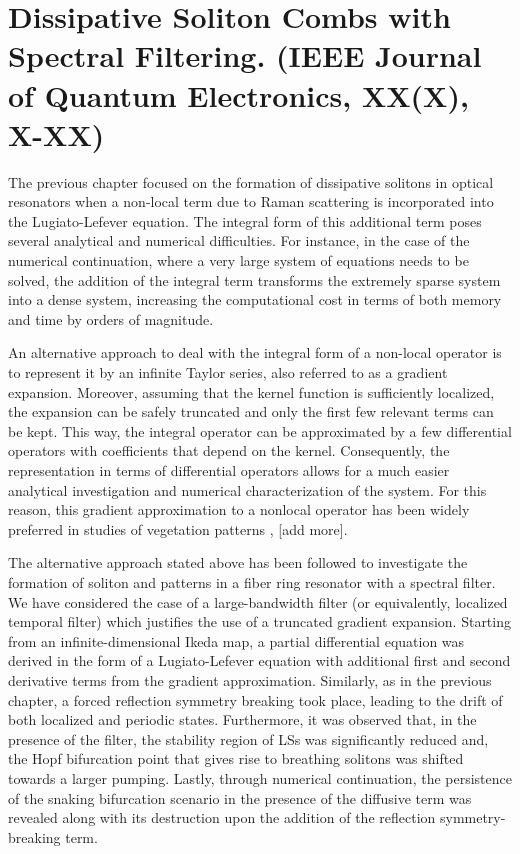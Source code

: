 \chapter{Dissipative Soliton Combs with Spectral Filtering. (IEEE Journal of Quantum Electronics, XX(X), X-XX)}

The previous chapter focused on the formation of dissipative solitons in optical
resonators when a non-local term due to Raman scattering is incorporated into the Lugiato-Lefever equation. The
integral form of this additional term poses several analytical and numerical difficulties.
For instance, in the case of the numerical continuation, where a very
large system of equations needs to be solved, the addition of the integral term transforms the extremely sparse
system into a dense system, increasing the computational cost in terms of both memory and time
by orders of magnitude.

An alternative approach to deal with the integral form of a non-local operator is to represent
it by an infinite Taylor series, also referred to as a gradient expansion. Moreover, 
assuming that the kernel function is sufficiently localized, the expansion can be
safely truncated and only the first few relevant terms can be kept. This way, the integral operator can be
approximated by a few differential operators with coefficients that depend on
the kernel. Consequently, the representation in terms of differential operators
allows for a much easier analytical investigation and numerical characterization of the system.
For this reason, this gradient approximation to a nonlocal operator has been widely 
preferred in studies of vegetation patterns \cite{lefever1997origin}, [add more].

The alternative approach stated above has been followed to investigate
the formation of soliton and patterns in a fiber ring resonator with a spectral filter. 
We have considered the case of a large-bandwidth filter (or equivalently, localized temporal filter)
which justifies the use of a truncated gradient expansion. Starting from an infinite-dimensional
Ikeda map, a partial differential equation was derived in the form of a Lugiato-Lefever equation with additional
first and second derivative terms from the gradient approximation. Similarly, as in the previous chapter,
a forced reflection symmetry breaking took place, leading to the drift of both localized and periodic states.
Furthermore, it was observed that, in the presence of the filter, the stability region of LSs was significantly reduced
and, the Hopf bifurcation point that gives rise to breathing solitons was shifted towards a larger pumping.
Lastly, through numerical continuation, the persistence of the snaking bifurcation scenario in
the presence of the diffusive term was revealed along with its destruction upon the addition of the reflection symmetry-breaking term.

